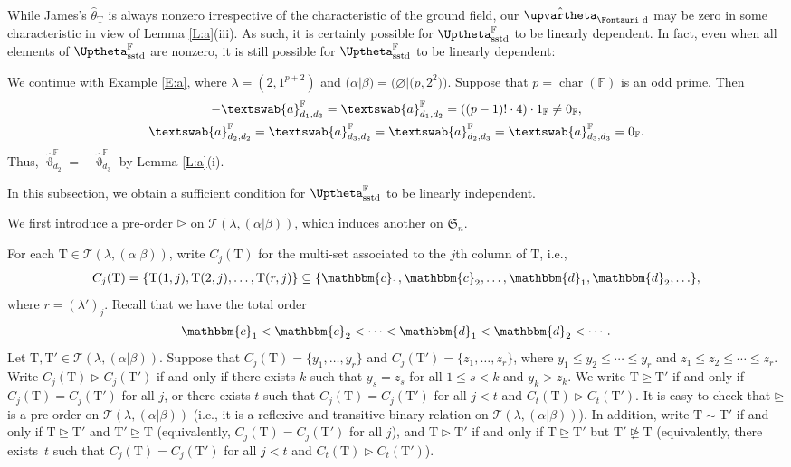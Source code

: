 \documentclass[pdftex]{sigma}
\renewcommand{\a}{\textswab{a}}
\newcommand{\TT}{\mathscr{T}}
\newcommand{\T}{\mathrm{T}}
\newcommand{\Char}{\operatorname{\mathrm{char}}}
\newcommand{\sym}[1]{\mathfrak{S}_{#1}}
\newcommand{\F}{\mathbb{F}}
\newcommand{\bb}[1]{\mathbbm{{#1}}}
\newcommand{\dR}{\text{\Fontauri d}}
\newcommand{\Jhom}{\upvartheta}
\newcommand{\hJhom}{\hat{\Jhom}}
\newcommand{\JHOM}{\Uptheta}
\newcommand{\hJHOM}{{\JHOM}}
\begin{document}
While James's $\hat{\theta}_{\T}$ is always nonzero irrespective of the characteristic of the ground field, our $\hJhom_{\dR}$ may be zero in some characteristic in view of Lemma \ref{L:a}(iii). As such, it is certainly possible for $\hJHOM_{\mathrm{sstd}}^{\F}$ to be linearly dependent. In fact, even when all elements of $\hJHOM_{\mathrm{sstd}}^{\F}$ are nonzero, it is still possible for $\hJHOM_{\mathrm{sstd}}^{\F}$ to be linearly dependent:

\begin{Example} \label{E:notli}
We continue with Example \ref{E:a}, where $\lambda = (2,1^{p+2})$ and $(\alpha|\beta) = \big(\varnothing|\big(p,2^2\big)\big)$. Suppose that $p=\Char(\F)$ is an odd prime. Then
\begin{gather*}
-\a^{\F}_{d_1,d_3} = \a^{\F}_{d_1,d_2} = ((p-1)! \cdot 4) \cdot 1_\F \ne 0_{\F}, \\
\a^{\F}_{d_2,d_2} = \a^{\F}_{d_3,d_2} = \a^{\F}_{d_2,d_3} = \a^{\F}_{d_3,d_3} = 0_{\F}.
\end{gather*}
Thus, $\hJhom_{d_2}^{\F} = -\hJhom_{d_3}^{\F}$ by Lemma \ref{L:a}(i).
\end{Example}

In this subsection, we obtain a sufficient condition for $\hJHOM_{\mathrm{sstd}}^{\F}$ to be linearly independent.

We first introduce a pre-order $\unrhd$ on $\TT(\lambda,(\alpha|\beta))$, which induces another on $\sym{n}$.

For each $\T \in \TT(\lambda,(\alpha|\beta))$, write $C_j(\T)$ for the multi-set associated to the $j$th column of $\T$, i.e.,
\begin{gather*}
C_j(\T) = \{ \T(1,j), \T(2,j), \dotsc,\T(r,j) \}\subseteq \{\bb{c}_1,\bb{c}_2,\ldots,\bb{d}_1,\bb{d}_2,\ldots\},\end{gather*} where $r=(\lambda')_j$. Recall that we have the total order \begin{gather*}\bb{c}_1<\bb{c}_2<\cdots<\bb{d}_1<\bb{d}_2<\cdots.\end{gather*}
Let $\T, \T' \in \TT(\lambda,(\alpha|\beta))$. Suppose that $C_j(\T) = \{ y_1,\ldots,y_r\}$ and $C_j(\T') = \{z_1,\ldots,z_r \}$, where $y_1\leq y_2 \leq \dotsb \leq y_r$ and $z_1 \leq z_2 \leq \dotsb \leq z_r$. Write $C_j(\T) \rhd C_j(\T')$ if and only if there exists $k$ such that $y_s = z_s$ for all $1 \leq s < k$ and $y_k>z_k$. We write $\T \unrhd \T'$ if and only if $C_j(\T) = C_j(\T')$ for all $j$, or there exists $t$ such that $C_j(\T) = C_j(\T')$ for all $j < t$ and $C_t(\T) \rhd C_t(\T')$. It is easy to check that $\unrhd$ is a pre-order on $\TT(\lambda,(\alpha|\beta))$ (i.e., it is a reflexive and transitive binary relation on $\TT(\lambda,(\alpha|\beta))$). In addition, write $\T \sim \T'$ if and only if $\T \unrhd \T'$ and $\T' \unrhd \T$ (equivalently, $C_j(\T) = C_j(\T')$ for all $j$), and $\T \rhd \T'$ if and only if $\T \unrhd \T'$ but $\T' \ntrianglerighteq \T$ (equivalently, there exists~$t$ such that $C_j(\T) = C_j(\T')$ for all $j < t$ and $C_t(\T) \rhd C_t(\T')$).
\end{document}
